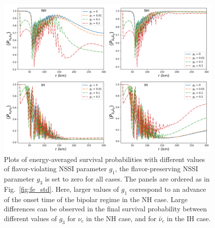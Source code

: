 \documentclass[a4paper,12pt]{article}
\begin{document}
\begin{figure}[t]
\begin{center}
\includegraphics[width=14cm]{flavor_evo_fv.png}
\caption{Plots of energy-averaged survival probabilities with different values of flavor-violating NSSI parameter $g_1$, the flavor-preserving NSSI parameter $g_3$ is set to zero for all cases. The panels are ordered as in Fig.~\ref{fig:fe_std}. Here, larger values of $g_1$ correspond to an advance of the onset time of the bipolar regime in the NH case. Large differences can be observed in the final survival probability between different values of $g_3$ for $\nu_e$ in the NH case, and for $\bar \nu_e$ in the IH case.}
\label{fig:fe_fv}
\end{center}
\end{figure}
\end{document}
